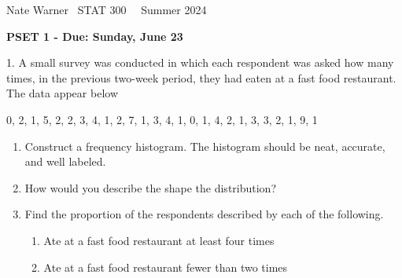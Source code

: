 \documentclass{report}
\title{\Huge{}}
\author{\huge{Nathan Warner}}
\date{\huge{}}
\begin{document}
    \pagebreak \bigbreak \noindent
    Nate Warner \ \quad \quad \quad \quad \quad \quad \quad \quad \quad \quad \quad \quad  STAT 300 \quad  \quad \quad \quad \quad \quad \quad \quad \quad \ \ \quad Summer 2024
    \begin{center}
        \textbf{PSET 1 - Due: Sunday, June 23}
    \end{center}
    \bigbreak \noindent 
    \begin{mdframed}
        1. A small survey was conducted in which each respondent was asked how many times,
        in the previous two-week period, they had eaten at a fast food restaurant. The data appear below
        \bigbreak \noindent 
        \begin{center}
            0, 2, 1, 5, 2, 2, 3, 4, 1, 2, 7, 1, 3, 4, 1, 0, 1, 4, 2, 1, 3, 3, 2, 1, 9, 1
        \end{center}
        \begin{enumerate}[label=(\alph*)]
            \item Construct a frequency histogram. The histogram should be neat, accurate, and well labeled. 
            \item How would you describe the shape the distribution? 
            \item Find the proportion of the respondents described by each of the following. 
                \begin{enumerate}[label=(\roman*)]
                    \item Ate at a fast food restaurant at least four times
                    \item Ate at a fast food restaurant fewer than two times
                \end{enumerate}
        \end{enumerate}
    \end{mdframed}
\end{document}

